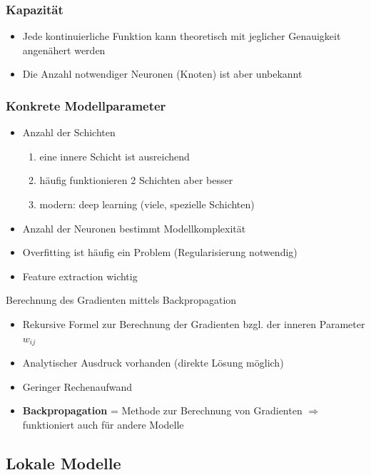 	\subsubsection{Kapazität}
	\begin{itemize}
		\item Jede kontinuierliche Funktion kann theoretisch mit jeglicher Genauigkeit angenähert werden
		\item Die Anzahl notwendiger Neuronen (Knoten) ist aber unbekannt
	\end{itemize}
	\subsubsection{Konkrete Modellparameter}
	\begin{itemize}
		\item Anzahl der Schichten\vspace*{-3pt}
		\begin{enumerate}[$\hookrightarrow$]
			\item eine innere Schicht ist ausreichend
			\item häufig funktionieren 2 Schichten aber besser
			\item modern: deep learning (viele, spezielle Schichten)
		\end{enumerate}
		\item Anzahl der Neuronen bestimmt Modellkomplexität
		\item Overfitting ist häufig ein Problem (Regularisierung notwendig)
		\item Feature extraction wichtig
	\end{itemize}
	Berechnung des Gradienten mittels Backpropagation
	\begin{itemize}
		\item Rekursive Formel zur Berechnung der Gradienten bzgl. der inneren Parameter $w_{ij}$
		\item Analytischer Ausdruck vorhanden (direkte Lösung möglich)
		\item Geringer Rechenaufwand
		\item \textbf{Backpropagation} = Methode zur Berechnung von Gradienten $\Rightarrow$ funktioniert auch für andere Modelle
	\end{itemize}
	\subsection{Lokale Modelle}
